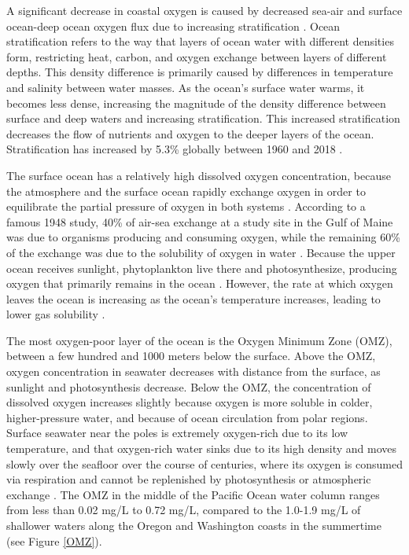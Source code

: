 \documentclass[12pt,twoside]{reedthesis}
\begin{document}
A significant decrease in coastal oxygen is caused by decreased sea-air and surface ocean-deep ocean oxygen flux due to increasing stratification \autocite{Barth2024, Mancini2024, Portner2019}. Ocean stratification refers to the way that layers of ocean water with different densities form, restricting heat, carbon, and oxygen exchange between layers of different depths. This density difference is primarily caused by differences in temperature and salinity between water masses. As the ocean's surface water warms, it becomes less dense, increasing the magnitude of the density difference between surface and deep waters and increasing stratification. This increased stratification decreases the flow of nutrients and oxygen to the deeper layers of the ocean. Stratification has increased by 5.3\% globally between 1960 and 2018 \autocite{Li2020a}. 

The surface ocean has a relatively high dissolved oxygen concentration, because the atmosphere and the surface ocean rapidly exchange oxygen in order to equilibrate the partial pressure of oxygen in both systems \autocite{Ito2010}. According to a famous 1948 study, 40\% of air-sea exchange at a study site in the Gulf of Maine was due to organisms producing and consuming oxygen, while the remaining 60\% of the exchange was due to the solubility of oxygen in water \autocite{Redfield1948}. Because the upper ocean receives sunlight, phytoplankton live there and photosynthesize, producing oxygen that primarily remains in the ocean \autocite{Li2020}. However, the rate at which oxygen leaves the ocean is increasing as the ocean's temperature increases, leading to lower gas solubility \autocite{Li2020}. 

The most oxygen-poor layer of the ocean is the Oxygen Minimum Zone (OMZ), between a few hundred and 1000 meters below the surface. Above the OMZ, oxygen concentration in seawater decreases with distance from the surface, as sunlight and photosynthesis decrease. Below the OMZ, the concentration of dissolved oxygen increases slightly because oxygen is more soluble in colder, higher-pressure water, and because of ocean circulation from polar regions. Surface seawater near the poles is extremely oxygen-rich due to its low temperature, and that oxygen-rich water sinks due to its high density and moves slowly over the seafloor over the course of centuries, where its oxygen is consumed via respiration and cannot be replenished by photosynthesis or atmospheric exchange \autocite{Karstensen2008, Deutsch2024, Ito2010}. The OMZ in the middle of the Pacific Ocean water column ranges from less than 0.02 mg/L to 0.72 mg/L, compared to the 1.0-1.9 mg/L of shallower waters along the Oregon and Washington coasts in the summertime \autocite{Karstensen2008, Deutsch2024, Barth2024, Pierce2012, Wyrtki1962} (see Figure \ref{OMZ}).
\end{document}
